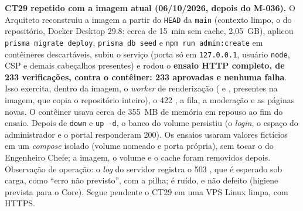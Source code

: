 \textbf{CT29 repetido com a imagem atual (06/10/2026, depois do M-036).} O Arquiteto reconstruiu a imagem a partir do \texttt{HEAD} da \texttt{main} (contexto limpo, o  do repositório, Docker Desktop 29.8: cerca de 15~min sem cache, 2,05~GB), aplicou \texttt{prisma migrate deploy}, \texttt{prisma db seed} e \texttt{npm run admin:create} em contêineres descartáveis, subiu o serviço (porta só em \texttt{127.0.0.1}, usuário \texttt{node}, CSP e demais cabeçalhos presentes) e rodou o \textbf{ensaio HTTP completo, de 233 verificações, contra o contêiner: 233 aprovadas e nenhuma falha}. Isso exercita, dentro da imagem, o \emph{worker} de renderização ( e , presentes na imagem, que copia o repositório inteiro), o 422 , a fila, a moderação e as páginas novas. O contêiner usava cerca de 355~MB de memória em repouso ao fim do ensaio. Depois de \texttt{down} e \texttt{up -d}, o banco do volume persistiu (o \emph{login}, o espaço do administrador e o portal responderam 200). Os ensaios usaram valores fictícios em um \emph{compose} isolado (volume nomeado e porta própria), sem tocar o  do Engenheiro Chefe; a imagem, o volume e o cache foram removidos depois. Observação de operação: o \emph{log} do servidor registra o 503 , que é esperado sob carga, como ``erro não previsto'', com a pilha; é ruído, e não defeito (higiene prevista para o Core). Segue pendente o CT29 em uma VPS Linux limpa, com HTTPS.

